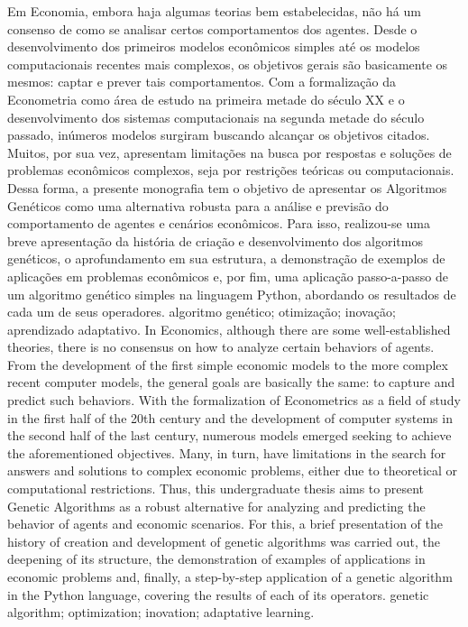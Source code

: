 \resumo
	{%
		Em Economia, embora haja algumas teorias bem estabelecidas, não há um consenso de como se analisar certos comportamentos dos agentes. Desde o desenvolvimento dos primeiros modelos econômicos simples até os modelos computacionais recentes mais complexos, os objetivos gerais são basicamente os mesmos: captar e prever tais comportamentos. Com a formalização da Econometria como área de estudo na primeira metade do século XX e o desenvolvimento dos sistemas computacionais na segunda metade do século passado, inúmeros modelos surgiram buscando alcançar os objetivos citados. Muitos, por sua vez, apresentam limitações na busca por respostas e soluções de problemas econômicos complexos, seja por restrições teóricas ou computacionais. Dessa forma, a presente monografia tem o objetivo de apresentar os Algoritmos Genéticos como uma alternativa robusta para a análise e previsão do comportamento de agentes e cenários econômicos. Para isso, realizou-se uma breve apresentação da história de criação e desenvolvimento dos algoritmos genéticos, o aprofundamento em sua estrutura, a demonstração de exemplos de aplicações em problemas econômicos e, por fim, uma aplicação passo-a-passo de um algoritmo genético simples na linguagem Python, abordando os resultados de cada um de seus operadores.
	}
	{algoritmo genético; otimização; inovação; aprendizado adaptativo.}
	{%
		In Economics, although there are some well-established theories, there is no consensus on how to analyze certain behaviors of agents. From the development of the first simple economic models to the more complex recent computer models, the general goals are basically the same: to capture and predict such behaviors. With the formalization of Econometrics as a field of study in the first half of the 20th century and the development of computer systems in the second half of the last century, numerous models emerged seeking to achieve the aforementioned objectives. Many, in turn, have limitations in the search for answers and solutions to complex economic problems, either due to theoretical or computational restrictions. Thus, this undergraduate thesis aims to present Genetic Algorithms as a robust alternative for analyzing and predicting the behavior of agents and economic scenarios. For this, a brief presentation of the history of creation and development of genetic algorithms was carried out, the deepening of its structure, the demonstration of examples of applications in economic problems and, finally, a step-by-step application of a genetic algorithm in the Python language, covering the results of each of its operators.
	}
	{genetic algorithm; optimization; inovation; adaptative learning.}


